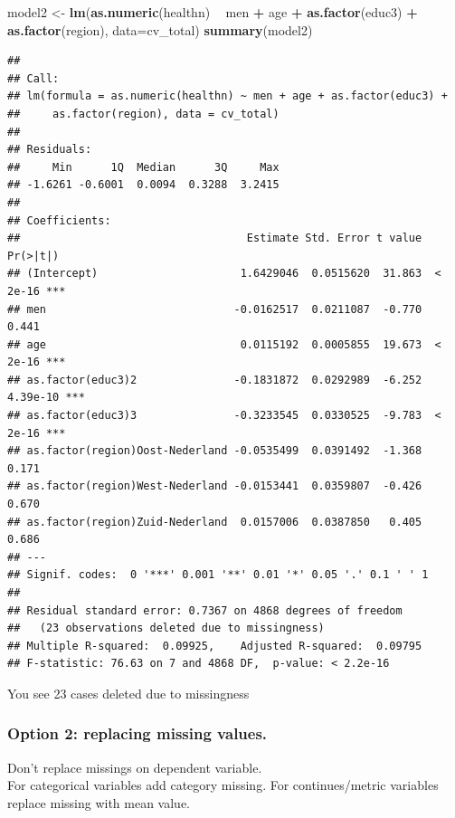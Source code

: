 \documentclass[
]{book}
\newenvironment{Shaded}{\begin{snugshade}}{\end{snugshade}}
\newcommand{\DataTypeTok}[1]{\textcolor[rgb]{0.13,0.29,0.53}{#1}}
\newcommand{\KeywordTok}[1]{\textcolor[rgb]{0.13,0.29,0.53}{\textbf{#1}}}
\newcommand{\NormalTok}[1]{#1}
\newcommand{\OperatorTok}[1]{\textcolor[rgb]{0.81,0.36,0.00}{\textbf{#1}}}
\newcommand{\StringTok}[1]{\textcolor[rgb]{0.31,0.60,0.02}{#1}}
\begin{document}
\begin{Shaded}
\begin{Highlighting}[numbers=left,,]
\NormalTok{model2 <-}\StringTok{ }\KeywordTok{lm}\NormalTok{(}\KeywordTok{as.numeric}\NormalTok{(healthn) }\OperatorTok{~}\StringTok{ }\NormalTok{men }\OperatorTok{+}\StringTok{ }\NormalTok{age }\OperatorTok{+}\StringTok{  }\KeywordTok{as.factor}\NormalTok{(educ3) }\OperatorTok{+}\StringTok{ }\KeywordTok{as.factor}\NormalTok{(region), }\DataTypeTok{data=}\NormalTok{cv_total)}
\KeywordTok{summary}\NormalTok{(model2)}
\end{Highlighting}
\end{Shaded}

\begin{verbatim}
## 
## Call:
## lm(formula = as.numeric(healthn) ~ men + age + as.factor(educ3) + 
##     as.factor(region), data = cv_total)
## 
## Residuals:
##     Min      1Q  Median      3Q     Max 
## -1.6261 -0.6001  0.0094  0.3288  3.2415 
## 
## Coefficients:
##                                   Estimate Std. Error t value Pr(>|t|)    
## (Intercept)                      1.6429046  0.0515620  31.863  < 2e-16 ***
## men                             -0.0162517  0.0211087  -0.770    0.441    
## age                              0.0115192  0.0005855  19.673  < 2e-16 ***
## as.factor(educ3)2               -0.1831872  0.0292989  -6.252 4.39e-10 ***
## as.factor(educ3)3               -0.3233545  0.0330525  -9.783  < 2e-16 ***
## as.factor(region)Oost-Nederland -0.0535499  0.0391492  -1.368    0.171    
## as.factor(region)West-Nederland -0.0153441  0.0359807  -0.426    0.670    
## as.factor(region)Zuid-Nederland  0.0157006  0.0387850   0.405    0.686    
## ---
## Signif. codes:  0 '***' 0.001 '**' 0.01 '*' 0.05 '.' 0.1 ' ' 1
## 
## Residual standard error: 0.7367 on 4868 degrees of freedom
##   (23 observations deleted due to missingness)
## Multiple R-squared:  0.09925,    Adjusted R-squared:  0.09795 
## F-statistic: 76.63 on 7 and 4868 DF,  p-value: < 2.2e-16
\end{verbatim}

You see 23 cases deleted due to missingness

\hypertarget{option-2-replacing-missing-values.}{%
\subsubsection{Option 2: replacing missing values.}\label{option-2-replacing-missing-values.}}

Don't replace missings on dependent variable.\\
For categorical variables add category missing.
For continues/metric variables replace missing with mean value.
\end{document}
